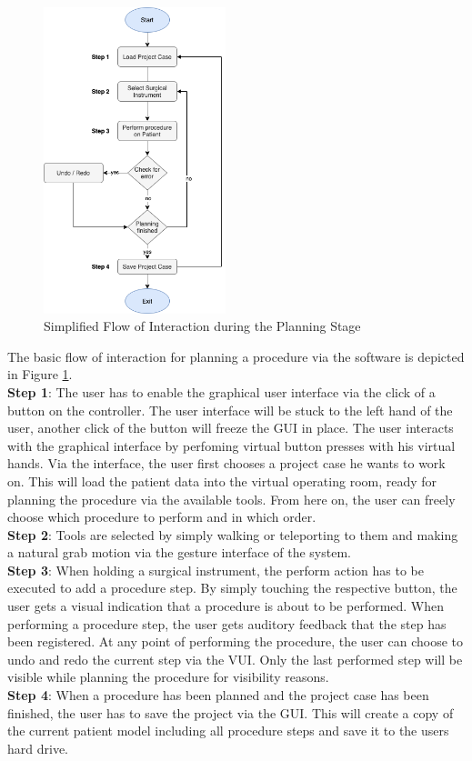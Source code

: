 \begin{figure}[ht]
    \centering
    \includegraphics[width=200px]{images/implementation/interaction_flow.png}
    \caption{\label{fig::InteractionFlow} Simplified Flow of Interaction during the Planning Stage}
\end{figure}

The basic flow of interaction for planning a procedure via the software is depicted in Figure \ref{fig::InteractionFlow}.
\\
\textbf{Step 1}: The user has to enable the graphical user interface via the click of a button on the controller.
The user interface will be stuck to the left hand of the user, another click of the button will freeze the GUI in place.
The user interacts with the graphical interface by perfoming virtual button presses with his virtual hands.
Via the interface, the user first chooses a project case he wants to work on.
This will load the patient data into the virtual operating room, ready for planning the procedure via the available tools.
From here on, the user can freely choose which procedure to perform and in which order.
\\
\textbf{Step 2}: Tools are selected by simply walking or teleporting to them and making a natural grab motion via the gesture interface of the system.
\\
\textbf{Step 3}: When holding a surgical instrument, the perform action has to be executed to add a procedure step.
By simply touching the respective button, the user gets a visual indication that a procedure is about to be performed.
When performing a procedure step, the user gets auditory feedback that the step has been registered.
At any point of performing the procedure, the user can choose to undo and redo the current step via the VUI.
Only the last performed step will be visible while planning the procedure for visibility reasons.
\\
\textbf{Step 4}: When a procedure has been planned and the project case has been finished, the user has to save the project via the GUI.
This will create a copy of the current patient model including all procedure steps and save it to the users hard drive.
